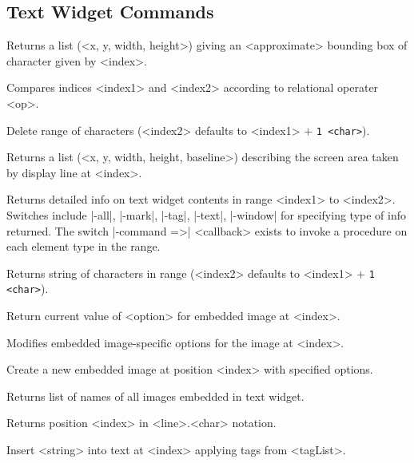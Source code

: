 \subsection*{Text Widget Commands}
\begin{enum}{1cm}

Returns a list (<x, y, width, height>)  giving an <approximate> 
bounding box of character given by <index>.

Compares indices <index1> and <index2> according to relational operater <op>.

Delete range of characters (<index2> defaults to <index1> $+$ {\tt 1 <char>}).

Returns a list (<x, y, width, height, baseline>) describing the screen area 
taken by display line at <index>.

Returns detailed info on text widget contents in range <index1> to <index2>.
Switches include |-all|, |-mark|, |-tag|, |-text|, |-window| for specifying
type of info returned. The switch |-command =>| <callback> exists to invoke
a procedure on each element type in the range.

Returns string of characters in range (<index2> defaults to <index1> $+$ {\tt 1 <char>}).

Return current value of <option> for embedded image at <index>.

Modifies embedded image-specific options for the image at <index>.

Create a new embedded image at position <index> with specified options.

Returns list of names of all images embedded in text widget.

Returns position <index> in <line>.<char> notation.

Insert <string> into text at <index> applying tags from <tagList>.


\end{enum}
